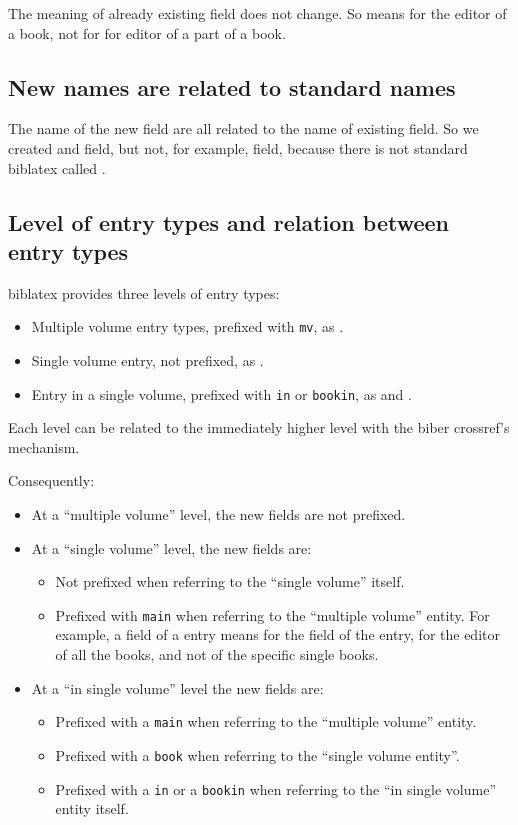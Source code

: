 \documentclass{ltxdockit}[2011/03/25]
\newcommand{\biblatex}{biblatex\xspace}
\begin{document}
 The meaning of already existing field does not change. So  means for the editor of a book, not for for editor of a part of a book.
 
\subsection{New names are related to standard names}
  The name of the new field are all related to the name of existing field. So we created  and  field, but not, for example,  field, because there is not standard \biblatex called .

\subsection{Level of entry types and relation between entry types}


 \biblatex provides three levels of entry types: 
  \begin{itemize}
  	\item Multiple volume entry types, prefixed with \verb+mv+, as .
    \item Single volume entry, not prefixed, as .
    \item Entry in a single volume, prefixed with \verb+in+ or \verb+bookin+, as   and .
  \end{itemize}
  
  Each level can be related to the immediately higher level with the biber crossref's mechanism. 
  
  
Consequently:
\begin{itemize}
  \item At a \enquote{multiple volume} level, the new fields are not prefixed. 
  \item At a \enquote{single volume} level, the new fields are:
  \begin{itemize}
    \item Not prefixed when referring to the \enquote{single volume} itself.
    \item Prefixed with \verb+main+ when referring to the \enquote{multiple volume} entity. For example, a  field of a  entry means for the  field of the  entry, for the editor of all the books, and not of the specific single books.
  \end{itemize}
  \item At a \enquote{in single volume} level the new fields are:
  \begin{itemize}
  	\item Prefixed with a \verb+main+ when referring to the \enquote{multiple volume} entity.
    \item Prefixed with a \verb+book+ when referring to the \enquote{single volume entity}.
    \item Prefixed with a \verb+in+ or a \verb+bookin+ when referring to the \enquote{in single volume} entity itself.
  \end{itemize}
\end{itemize}
\end{document}
